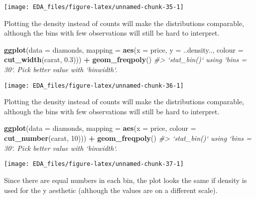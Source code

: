 \documentclass[]{book}
\newenvironment{Shaded}{\begin{snugshade}}{\end{snugshade}}
\newcommand{\CommentTok}[1]{\textcolor[rgb]{0.56,0.35,0.01}{\textit{#1}}}
\newcommand{\DataTypeTok}[1]{\textcolor[rgb]{0.13,0.29,0.53}{#1}}
\newcommand{\DecValTok}[1]{\textcolor[rgb]{0.00,0.00,0.81}{#1}}
\newcommand{\FloatTok}[1]{\textcolor[rgb]{0.00,0.00,0.81}{#1}}
\newcommand{\KeywordTok}[1]{\textcolor[rgb]{0.13,0.29,0.53}{\textbf{#1}}}
\newcommand{\NormalTok}[1]{#1}
\newcommand{\OperatorTok}[1]{\textcolor[rgb]{0.81,0.36,0.00}{\textbf{#1}}}
\newcommand{\StringTok}[1]{\textcolor[rgb]{0.31,0.60,0.02}{#1}}
\theoremstyle{definition}
\theoremstyle{definition}
\theoremstyle{definition}
\theoremstyle{remark}
\begin{document}
\begin{center}\texttt{[image: EDA\_files/figure-latex/unnamed-chunk-35-1]} \end{center}

Plotting the density instead of counts will make the distributions
comparable, although the bins with few observations will still be hard
to interpret.

\begin{Shaded}
\begin{Highlighting}[]
\KeywordTok{ggplot}\NormalTok{(}\DataTypeTok{data =}\NormalTok{ diamonds,}
       \DataTypeTok{mapping =} \KeywordTok{aes}\NormalTok{(}\DataTypeTok{x =}\NormalTok{ price,}
                     \DataTypeTok{y =}\NormalTok{ ..density..,}
                     \DataTypeTok{colour =} \KeywordTok{cut_width}\NormalTok{(carat, }\FloatTok{0.3}\NormalTok{))) }\OperatorTok{+}
\StringTok{  }\KeywordTok{geom_freqpoly}\NormalTok{()}
\CommentTok{#> `stat_bin()` using `bins = 30`. Pick better value with `binwidth`.}
\end{Highlighting}
\end{Shaded}

\begin{center}\texttt{[image: EDA\_files/figure-latex/unnamed-chunk-36-1]} \end{center}

Plotting the density instead of counts will make the distributions
comparable, although the bins with few observations will still be hard
to interpret.

\begin{Shaded}
\begin{Highlighting}[]
\KeywordTok{ggplot}\NormalTok{(}\DataTypeTok{data =}\NormalTok{ diamonds,}
       \DataTypeTok{mapping =} \KeywordTok{aes}\NormalTok{(}\DataTypeTok{x =}\NormalTok{ price,}
                     \DataTypeTok{colour =} \KeywordTok{cut_number}\NormalTok{(carat, }\DecValTok{10}\NormalTok{))) }\OperatorTok{+}
\StringTok{  }\KeywordTok{geom_freqpoly}\NormalTok{()}
\CommentTok{#> `stat_bin()` using `bins = 30`. Pick better value with `binwidth`.}
\end{Highlighting}
\end{Shaded}

\begin{center}\texttt{[image: EDA\_files/figure-latex/unnamed-chunk-37-1]} \end{center}

Since there are equal numbers in each bin, the plot looks the same if
density is used for the y aesthetic (although the values are on a
different scale).
\end{document}

